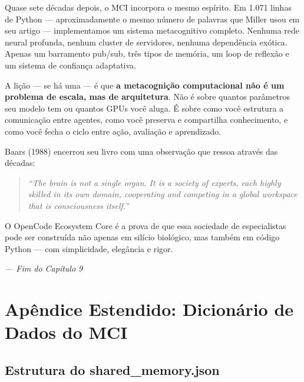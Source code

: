 Quase sete décadas depois, o MCI incorpora o mesmo espírito. Em 1.071 linhas de Python — aproximadamente o mesmo número de palavras que Miller usou em seu artigo — implementamos um sistema metacognitivo completo. Nenhuma rede neural profunda, nenhum cluster de servidores, nenhuma dependência exótica. Apenas um barramento pub/sub, três tipos de memória, um loop de reflexão e um sistema de confiança adaptativa.

A lição — se há uma — é que \textbf{a metacognição computacional não é um problema de escala, mas de arquitetura}. Não é sobre quantos parâmetros seu modelo tem ou quantos GPUs você aluga. É sobre como você estrutura a comunicação entre agentes, como você preserva e compartilha conhecimento, e como você fecha o ciclo entre ação, avaliação e aprendizado.

Baars (1988) \cite{Baars1988_GWT} encerrou seu livro com uma observação que ressoa através das décadas:

\begin{quote}
\textit{``The brain is not a single organ. It is a society of experts, each highly skilled in its own domain, cooperating and competing in a global workspace that is consciousness itself.''}
\end{quote}

O OpenCode Ecosystem Core é a prova de que essa sociedade de especialistas pode ser construída não apenas em silício biológico, mas também em código Python — com simplicidade, elegância e rigor.

\begin{flushright}
\textit{--- Fim do Capítulo 9}
\end{flushright}


\section{Apêndice Estendido: Dicionário de Dados do MCI}
\label{sec:data-dictionary}

\subsection{Estrutura do shared\_memory.json}

